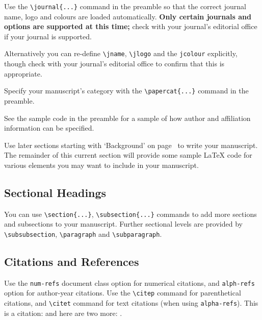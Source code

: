 \documentclass[a4paper,alpha-refs]{aejstyles}
\begin{document}
Use the \verb|\journal{...}| command in the preamble so that the correct journal name, logo and colours are loaded automatically. \textbf{Only certain journals and options are supported at this time;} check with your journal's editorial office if your journal is supported.

Alternatively you can re-define \verb|\jname|, \verb|\jlogo| and the \verb|jcolour| explicitly, though check with your journal's editorial office to confirm that this is appropriate.

Specify your manuscript's category with the \verb|\papercat{...}| command in the preamble.

See the sample code in the preamble for a sample of how author and affiliation information can be specified.

Use later sections starting with `Background' on page~\pageref{sec:background} to write your manuscript. The remainder of this current section will provide some sample \LaTeX{} code for various elements you may want to include in your manuscript.

\subsection{Sectional Headings}
You can use \verb|\section{...}|, \verb|\subsection{...}| commands to add more sections and subsections to your manuscript. Further sectional levels are provided by \verb|\subsubsection|, \verb|\paragraph| and \verb|\subparagraph|.

\subsection{Citations and References}
Use the \verb|num-refs| document class option for numerical citations, and \verb|alph-refs| option for author-year citations.
Use the \verb|\citep| command for parenthetical citations, and \verb|\citet| command for text citations (when using \verb|alpha-refs|).
This is a citation: \citep{Fan:2004} and here are two more: \citep{Cox:1972,Hear:Holm:Step:quan:2006}.
\end{document}
